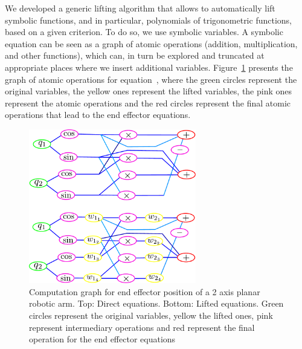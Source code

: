 We developed a generic lifting algorithm that allows to automatically lift symbolic functions, and in particular, polynomials of trigonometric functions, based on a given criterion.
To do so, we use symbolic variables. A symbolic equation can be seen as a graph of atomic operations (addition, multiplication, and other functions), which can, in turn be explored and truncated at appropriate places where we insert additional variables.
Figure~\ref{fig:graph_direct} presents the graph of atomic operations for equation~, where the green circles represent the original variables, the yellow ones represent the lifted variables, the pink ones represent the atomic operations and the red circles represent the final atomic operations that lead to the end effector equations.
\begin{figure}
  \centering
  \includegraphics[width=0.65\textwidth]{graphDirectLiftedEEPos.pdf}
  \caption{Computation graph for end effector position of a 2 axis planar robotic arm. Top: Direct equations. Bottom: Lifted equations. Green circles represent the original variables, yellow the lifted ones, pink represent intermediary operations and red represent the final operation for the end effector equations}
\label{fig:graph_direct}
\end{figure}


